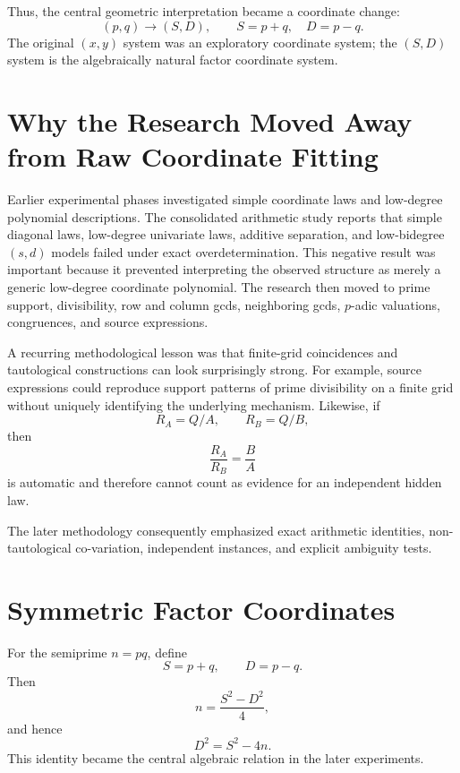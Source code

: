 \documentclass[11pt,a4paper]{article}
\begin{document}
Thus, the central geometric interpretation became a coordinate change:
\[
(p,q)\longrightarrow (S,D),
\qquad
S=p+q,
\quad
D=p-q.
\]
The original $(x,y)$ system was an exploratory coordinate system; the $(S,D)$ system is the algebraically natural factor coordinate system.

\section{Why the Research Moved Away from Raw Coordinate Fitting}

Earlier experimental phases investigated simple coordinate laws and low-degree polynomial descriptions.  The consolidated arithmetic study reports that simple diagonal laws, low-degree univariate laws, additive separation, and low-bidegree $(s,d)$ models failed under exact overdetermination.  This negative result was important because it prevented interpreting the observed structure as merely a generic low-degree coordinate polynomial.  The research then moved to prime support, divisibility, row and column gcds, neighboring gcds, $p$-adic valuations, congruences, and source expressions. 

A recurring methodological lesson was that finite-grid coincidences and tautological constructions can look surprisingly strong.  For example, source expressions could reproduce support patterns of prime divisibility on a finite grid without uniquely identifying the underlying mechanism.  Likewise, if
\[
 R_A=Q/A,
 \qquad
 R_B=Q/B,
\]
then
\[
 \frac{R_A}{R_B}=\frac BA
\]
is automatic and therefore cannot count as evidence for an independent hidden law.

The later methodology consequently emphasized exact arithmetic identities, non-tautological co-variation, independent instances, and explicit ambiguity tests.

\section{Symmetric Factor Coordinates}

For the semiprime $n=pq$, define
\begin{equation}
 S=p+q,
 \qquad
 D=p-q.
\end{equation}
Then
\begin{equation}
 n=\frac{S^2-D^2}{4},
 \label{eq:nSD}
\end{equation}
and hence
\begin{equation}
 D^2=S^2-4n.
 \label{eq:disc2}
\end{equation}
This identity became the central algebraic relation in the later experiments.
\end{document}
